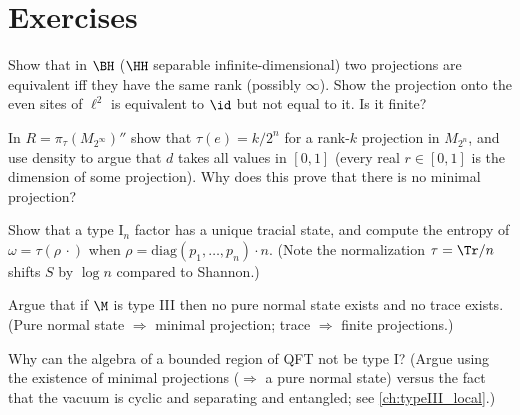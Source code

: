 \section*{Exercises}
\begin{exercise}
Show that in $\BH$ ($\HH$ separable infinite-dimensional) two projections are equivalent iff they have the same rank (possibly $\infty$). Show the projection onto the even sites of $\ell^2$ is equivalent to $\id$ but not equal to it. Is it finite?
\end{exercise}
\begin{exercise}
In $R=\pi_\tau(M_{2^\infty})''$ show that $\tau(e)=k/2^n$ for a rank-$k$ projection in $M_{2^n}$, and use density to argue that $d$ takes all values in $[0,1]$ (every real $r\in[0,1]$ is the dimension of some projection). Why does this prove that there is no minimal projection?
\end{exercise}
\begin{exercise}
Show that a type I$_n$ factor has a unique tracial state, and compute the entropy of $\omega=\tau(\rho\,\cdot)$ when $\rho=\mathrm{diag}(p_1,\dots,p_n)\cdot n$. (Note the normalization $\tau=\Tr/n$ shifts $S$ by $\log n$ compared to Shannon.)
\end{exercise}
\begin{exercise}
Argue that if $\M$ is type III then no pure normal state exists and no trace exists. (Pure normal state $\Rightarrow$ minimal projection; trace $\Rightarrow$ finite projections.)
\end{exercise}
\begin{exercise}
Why can the algebra of a bounded region of QFT not be type I? (Argue using the existence of minimal projections ($\Rightarrow$ a pure normal state) versus the fact that the vacuum is cyclic and separating and entangled; see \cref{ch:typeIII_local}.)
\end{exercise}
